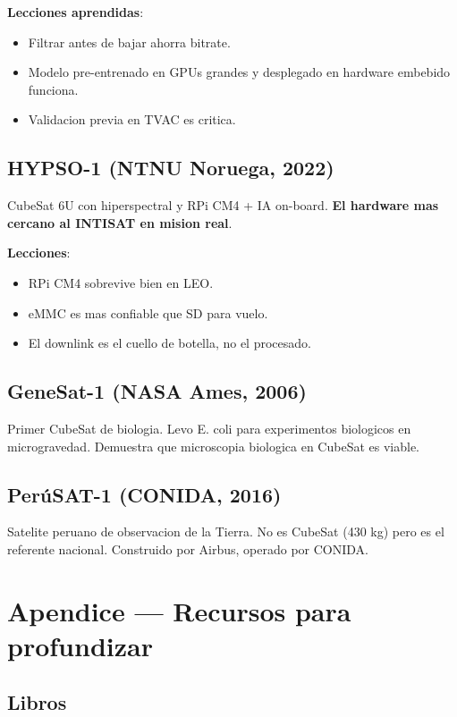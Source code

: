 \documentclass[11pt,a4paper,oneside,openright]{book}
\begin{document}
\textbf{Lecciones aprendidas}:
\begin{itemize}[leftmargin=2em]
  \item Filtrar antes de bajar ahorra bitrate.
  \item Modelo pre-entrenado en GPUs grandes y desplegado en hardware
        embebido funciona.
  \item Validacion previa en TVAC es critica.
\end{itemize}

\section{HYPSO-1 (NTNU Noruega, 2022)}

CubeSat 6U con hiperspectral y RPi CM4 + IA on-board. \textbf{El hardware mas
cercano al INTISAT en mision real}.

\textbf{Lecciones}:
\begin{itemize}[leftmargin=2em]
  \item RPi CM4 sobrevive bien en LEO.
  \item eMMC es mas confiable que SD para vuelo.
  \item El downlink es el cuello de botella, no el procesado.
\end{itemize}

\section{GeneSat-1 (NASA Ames, 2006)}

Primer CubeSat de biologia. Levo E. coli para experimentos biologicos en
microgravedad. Demuestra que microscopia biologica en CubeSat es viable.

\section{PerúSAT-1 (CONIDA, 2016)}

Satelite peruano de observacion de la Tierra. No es CubeSat (430 kg) pero
es el referente nacional. Construido por Airbus, operado por CONIDA.

\chapter{Apendice --- Recursos para profundizar}

\section{Libros}
\end{document}

